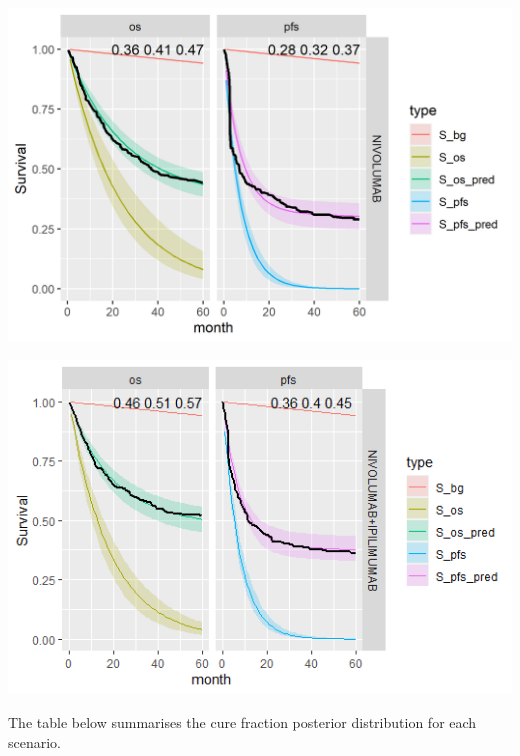 \documentclass[
]{article}
\begin{document}
\begin{center}\includegraphics[width=0.4\linewidth]{../plots/S_plots_exp_exp_cf hier_bg_fixed_NIVOLUMAB} \end{center}

\begin{center}\includegraphics[width=0.4\linewidth]{../plots/S_plots_exp_exp_cf_hier_bg_fixed_NIVO+IPI} \end{center}

The table below summarises the cure fraction posterior distribution for
each scenario.
\end{document}
